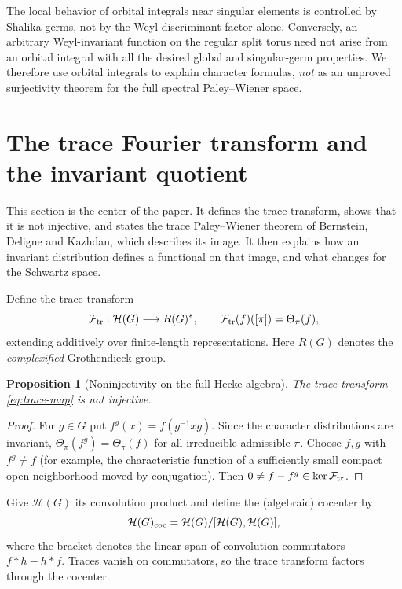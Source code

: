 \documentclass[12pt,letterpaper]{amsart}
\numberwithin{equation}{section}
\newtheorem{proposition}[theorem]{Proposition}
\theoremstyle{definition}
\theoremstyle{remark}
\newcommand{\calH}{\mathcal H}
\begin{document}
The local behavior of orbital integrals near singular elements is controlled by Shalika germs, not by the Weyl-discriminant factor alone.  Conversely, an arbitrary Weyl-invariant function on the regular split torus need not arise from an orbital integral with all the desired global and singular-germ properties.  We therefore use orbital integrals to explain character formulas, \emph{not} as an unproved surjectivity theorem for the full spectral Paley--Wiener space.

\section{The trace Fourier transform and the invariant quotient}\label{sec:cocenter}
This section is the center of the paper. It defines the trace transform, shows that it is not injective, and states the trace Paley--Wiener theorem of Bernstein, Deligne and Kazhdan, which describes its image. It then explains how an invariant distribution defines a functional on that image, and what changes for the Schwartz space.

Define the trace transform
\begin{equation}\label{eq:trace-map}
\mathcal F_{\rm tr}:\calH(G)\longrightarrow R(G)^*,\qquad
\mathcal F_{\rm tr}(f)([\pi])=\Theta_\pi(f),
\end{equation}
extending additively over finite-length representations. Here $R(G)$ denotes the \emph{complexified} Grothendieck group.

\begin{proposition}[Noninjectivity on the full Hecke algebra]\label{prop:kernel}
The trace transform \eqref{eq:trace-map} is not injective.
\end{proposition}
\begin{proof}
For $g\in G$ put $f^g(x)=f(g^{-1}xg)$.  Since the character distributions are invariant, $\Theta_\pi(f^g)=\Theta_\pi(f)$ for all irreducible admissible $\pi$.  Choose $f,g$ with $f^g\ne f$ (for example, the characteristic function of a sufficiently small compact open neighborhood moved by conjugation).  Then $0\ne f-f^g\in\ker\mathcal F_{\rm tr}$.
\end{proof}

Give $\calH(G)$ its convolution product and define the (algebraic) cocenter by
\begin{equation}\label{eq:cocenter}
\calH(G)_{\rm coc}=\calH(G)/[\calH(G),\calH(G)],
\end{equation}
where the bracket denotes the linear span of convolution commutators $f*h-h*f$. Traces vanish on commutators, so the trace transform factors through the cocenter.
\end{document}
